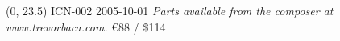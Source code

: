 \documentclass[10pt]{article}
\begin{document}
\begin{textblock}{23}(0, 23.5)
ICN-002 2005-10-01
\hfill \textit{Parts available from the composer at www.trevorbaca.com.}
\hfill \euro 88 / \$114
\end{textblock}
\end{document}
